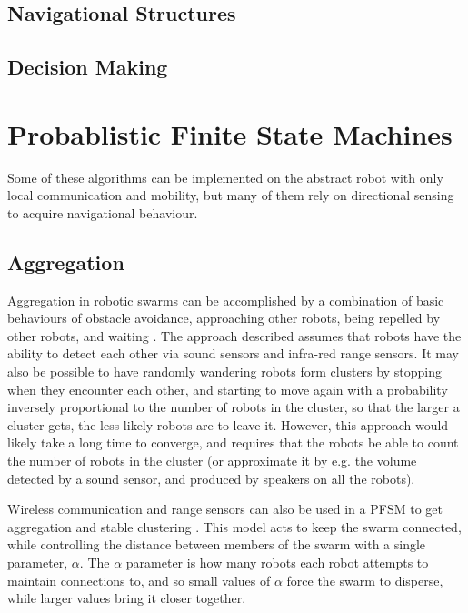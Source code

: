 \documentclass[]{article}
\begin{document}
\subsection{Navigational Structures}

\subsection{Decision Making}

\section{Probablistic Finite State Machines}

Some of these algorithms can be implemented on the abstract robot with only local communication and mobility, but many of them rely on directional sensing to acquire navigational behaviour. 

\subsection{Aggregation}

Aggregation in robotic swarms can be accomplished by a combination of basic behaviours of obstacle avoidance, approaching other robots, being repelled by other robots, and waiting \cite{soysal2005probabilistic}.
The approach described assumes that robots have the ability to detect each other via sound sensors and infra-red range sensors. 
It may also be possible to have randomly wandering robots form clusters by stopping when they encounter each other, and starting to move again with a probability inversely proportional to the number of robots in the cluster, so that the larger a cluster gets, the less likely robots are to leave it. 
However, this approach would likely take a long time to converge, and requires that the robots be able to count the number of robots in the cluster (or approximate it by e.g. the volume detected by a sound sensor, and produced by speakers on all the robots).

Wireless communication and range sensors can also be used in a PFSM to get aggregation and stable clustering \cite{winfield2008modelling}.
This model acts to keep the swarm connected, while controlling the distance between members of the swarm with a single parameter, $\alpha$.
The $\alpha$ parameter is how many robots each robot attempts to maintain connections to, and so small values of $\alpha$ force the swarm to disperse, while larger values bring it closer together. 
\end{document}
